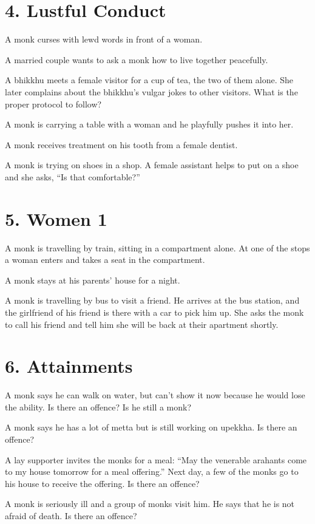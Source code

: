 \section{4. Lustful Conduct}

A monk curses with lewd words in front of a woman.

A married couple wants to ask a monk how to live together peacefully.

A bhikkhu meets a female visitor for a cup of tea, the two of them
alone. She later complains about the bhikkhu's vulgar jokes to other
visitors. What is the proper protocol to follow?

A monk is carrying a table with a woman and he playfully pushes it into
her.

A monk receives treatment on his tooth from a female dentist.

A monk is trying on shoes in a shop. A female assistant helps to put on
a shoe and she asks, ``Is that comfortable?''

\section{5. Women 1}

A monk is travelling by train, sitting in a compartment alone. At one of
the stops a woman enters and takes a seat in the compartment.

A monk stays at his parents' house for a night.

A monk is travelling by bus to visit a friend. He arrives at the bus
station, and the girlfriend of his friend is there with a car to pick
him up. She asks the monk to call his friend and tell him she will be
back at their apartment shortly.

\section{6. Attainments}

A monk says he can walk on water, but can't show it now because he would
lose the ability. Is there an offence? Is he still a monk?

A monk says he has a lot of metta but is still working on upekkha. Is
there an offence?

A lay supporter invites the monks for a meal: ``May the venerable
arahants come to my house tomorrow for a meal offering.'' Next day, a
few of the monks go to his house to receive the offering. Is there an
offence?

A monk is seriously ill and a group of monks visit him. He says that he
is not afraid of death. Is there an offence?


